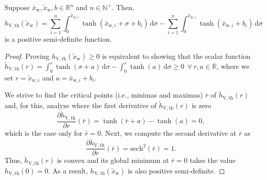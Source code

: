\begin{lemma}\label{lemma:con:V_tanh_term_lower_term}
    Suppose $\bar{x}_{\mathrm{w}}, \tilde{x}_{\mathrm{w}}, b \in \mathbb{R}^n$ and $n \in \mathbb{N}^+$. Then,
    \begin{equation}
        h_{\mathrm{V,th}}(\tilde{x}_{\mathrm{w}}) = \sum_{i=1}^n \int_{0}^{\tilde{x}_{\mathrm{w},i}} \tanh(\bar{x}_{\mathrm{w},i}+\sigma+b_i) \, \mathrm{d} \sigma - \sum_{i=1}^n \int_{0}^{\tilde{x}_{\mathrm{w},i}} \tanh(\bar{x}_{\mathrm{w},i}+b_i) \, \mathrm{d} \sigma
    \end{equation}
    is a positive semi-definite function.
\end{lemma}
\begin{proof}
    Proving $h_{\mathrm{V},\mathrm{th}}(\tilde{x}_\mathrm{w}) \geq 0$ is equivalent to showing that the scalar function $\breve{h}_{\mathrm{V},\mathrm{th}}(r) = \int_{0}^r \tanh(\sigma + a) \, \mathrm{d}\sigma - \int_{0}^r \tanh(a) \, \mathrm{d}\sigma \geq 0 \: \: \forall \: r, a \in \mathbb{R}$, where we set $r = \tilde{x}_{\mathrm{w},i}$ and $a = \bar{x}_{\mathrm{w},i} + b_i$.
    
    We strive to find the critical points (i.e., minimas and maximas) $\bar{r}$ of $\breve{h}_\mathrm{V,th}(r)$ and, for this, analyze where the first derivative of $\breve{h}_\mathrm{V,th}(r)$ is zero
    \begin{equation}
        \frac{\partial \breve{h}_\mathrm{V,th}}{\partial r}(\bar{r}) = \tanh(\bar{r}+a) - \tanh(a) = 0,
    \end{equation}
    which is the case only for $\bar{r}=0$. Next, we compute the second derivative at $\bar{r}$ as
    \begin{equation}
        \frac{\partial \breve{h}_\mathrm{V,th}}{\partial r}(\bar{r}) = \mathrm{sech}^2(\bar{r}) = 1.
    \end{equation}
    Thus, $\breve{h}_\mathrm{V,th}(r)$ is convex and its global minimum at $\bar{r}=0$ takes the value $h_\mathrm{V,th}(0) = 0$.
    As a result, $h_{\mathrm{V},\mathrm{th}}(\tilde{x}_\mathrm{w})$ is also positive semi-definite.
\end{proof}

